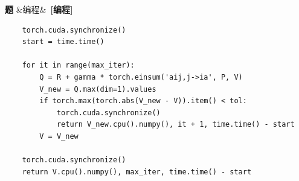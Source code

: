 \documentclass[12pt, a4paper]{article}
\newcounter{probcnt}
\newenvironment{problem}[1][]{%
  \stepcounter{probcnt}
  \begin{mdframed}[linecolor=black!30, backgroundcolor=gray!4,
    innertopmargin=8pt, innerbottommargin=8pt,
    innerleftmargin=10pt, innerrightmargin=10pt,
    skipabove=10pt, skipbelow=4pt]
  \noindent\textbf{题 \theprobcnt}\ifx&#1&\else\ \textbf{[#1]}\fi\quad
}{%
  \end{mdframed}
}
\begin{document}
\begin{problem}[编程]
\begin{lstlisting}
    torch.cuda.synchronize()
    start = time.time()

    for it in range(max_iter):
        Q = R + gamma * torch.einsum('aij,j->ia', P, V)
        V_new = Q.max(dim=1).values
        if torch.max(torch.abs(V_new - V)).item() < tol:
            torch.cuda.synchronize()
            return V_new.cpu().numpy(), it + 1, time.time() - start
        V = V_new

    torch.cuda.synchronize()
    return V.cpu().numpy(), max_iter, time.time() - start
\end{lstlisting}

\end{problem}
\end{document}
